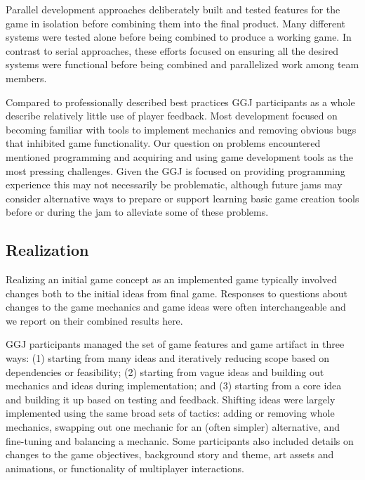 \documentclass{sig-alternate}
\begin{document}
Parallel development approaches deliberately built and tested features for the game in isolation before combining them into the final product. Many different systems were tested alone before being combined to produce a working game. In contrast to serial approaches, these efforts focused on ensuring all the desired systems were functional before being combined and parallelized work among team members.

Compared to professionally described best practices \cite{fullerton2008:playcentric} GGJ participants as a whole describe relatively little use of player feedback. Most development focused on becoming familiar with tools to implement mechanics and removing obvious bugs that inhibited game functionality. Our question on problems encountered mentioned programming and acquiring and using game development tools as the most pressing challenges. Given the GGJ is focused on providing programming experience this may not necessarily be problematic, although future jams may consider alternative ways to prepare or support learning basic game creation tools before or during the jam to alleviate some of these problems.

\subsection{Realization}
Realizing an initial game concept as an implemented game typically involved changes both to the initial ideas from final game. Responses to questions about changes to the game mechanics and game ideas were often interchangeable and we report on their combined results here.

GGJ participants managed the set of game features and game artifact in three ways:
(1) starting from many ideas and iteratively reducing scope based on dependencies or feasibility;
(2) starting from vague ideas and building out mechanics and ideas during implementation;
and
(3) starting from a core idea and building it up based on testing and feedback.
Shifting ideas were largely implemented using the same broad sets of tactics: adding or removing whole mechanics, swapping out one mechanic for an (often simpler) alternative, and fine-tuning and balancing a mechanic. Some participants also included details on changes to the game objectives, background story and theme, art assets and animations, or functionality of multiplayer interactions.
\end{document}
